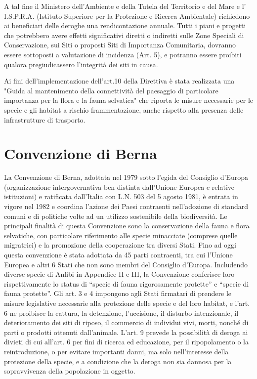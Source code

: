 \documentclass[11pt,a4paper,twoside]{memoir}
\begin{document}
A tal fine il Ministero dell’Ambiente e della Tutela del Territorio e del Mare e l' I.S.P.R.A. (Istituto Superiore per la Protezione e Ricerca Ambientale) richiedono ai beneficiari delle deroghe una rendicontazione annuale. Tutti i piani e progetti che potrebbero avere effetti significativi diretti o indiretti sulle Zone Speciali di Conservazione, sui Siti o proposti Siti di Importanza Comunitaria, dovranno essere sottoposti a valutazione di incidenza (Art. 5), e potranno essere proibiti qualora pregiudicassero l’integrità dei siti in causa.

Ai fini dell'implementazione dell'art.10 della Direttiva è stata realizzata una "Guida al mantenimento della connettività del paesaggio di particolare importanza per la flora e la fauna selvatica" che riporta le misure necessarie per le specie e gli habitat a rischio frammentazione, anche rispetto alla presenza delle infrastrutture di trasporto.

\section{Convenzione di Berna}
\label{sec:norme_berna}
La Convenzione di Berna, adottata nel 1979 sotto l’egida del Consiglio d’Europa (organizzazione intergovernativa ben distinta dall'Unione Europea e relative istituzioni) e ratificata dall’Italia con L.N. 503 del 5 agosto 1981, è entrata in vigore nel 1982 e coordina l'azione dei Paesi contraenti nell'adozione di standard comuni e di politiche volte ad un utilizzo sostenibile della biodiversità. Le principali finalità di questa Convenzione sono la conservazione della fauna e flora selvatiche, con particolare riferimento alle specie minacciate (comprese quelle migratrici) e la promozione della cooperazione tra diversi Stati. Fino ad oggi questa convenzione è stata adottata da 45 parti contraenti, tra cui l'Unione Europea e altri 6 Stati che non sono membri del Consiglio d'Europa. Includendo diverse specie di Anfibi in Appendice II e III, la Convenzione conferisce loro rispettivamente lo status di “specie di fauna rigorosamente protette” e “specie di fauna protette”. Gli art. 3 e 4 impongono agli Stati firmatari di prendere le misure legislative necessarie alla protezione delle specie e del loro habitat, e l’art. 6 ne proibisce la cattura, la detenzione, l’uccisione, il disturbo intenzionale, il deterioramento dei siti di riposo, il commercio di individui vivi, morti, nonché di parti o prodotti ottenuti dall’animale. L’art. 9 prevede la possibilità di deroga ai divieti di cui all’art. 6 per fini di ricerca ed educazione, per il ripopolamento o la reintroduzione, o per evitare importanti danni, ma solo nell’interesse della protezione della specie, e a condizione che la deroga non sia dannosa per la sopravvivenza della popolazione in oggetto.
\end{document}
